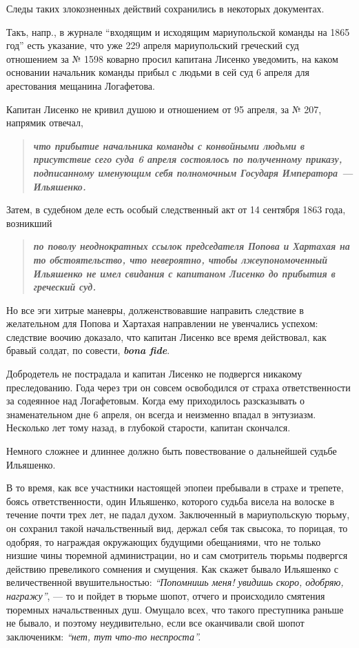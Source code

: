 \documentclass[a4paper,20pt]{report}
\begin{document}
Следы таких злокозненных действий сохранились в
некоторых документах.

Такъ, напр., в журнале ``входящим и исходящим
мариупольской команды на 1865 год'' есть указание, что
уже 229 апреля мариупольский греческий суд отношением 
за № 1598 коварно просил капитана Лисенко уведомить,
на каком основании начальник команды прибыл с людьми в сей суд 6 апреля для 
арестования мещанина Логафетова.

Капитан Лисенко не кривил душою и отношением от 95 апреля, за № 207, напрямик
отвечал, 

\begin{quote}
\em\bfseries
что прибытие начальника команды с конвойными людьми в
присутствие сего суда 6 апреля состоялось по полученному
приказу, подписанному именующим себя полномочным
Государя Императора — Ильяшенко.
\end{quote}

Затем, в судебном деле есть особый следственный
акт от 14 сентября 1863 года, возникший 
\begin{quote}
\em\bfseries
по поволу неоднократных ссылок председателя Попова и Хартахая
на то обстоятельство, что невероятно, чтобы лжеупономоченный 
Ильяшенко не имел свидания с капитаном Лисенко до прибытия в греческий суд.
\end{quote}

Но все эги хитрые маневры, долженствовавшие направить следствие в желательном для Попова и Хартахая
направлении не увенчались успехом: следствие воочию доказало, что капитан Лисенко все время действовал, как бравый
солдат, по совести, \textbf{\em bona fide}.

Добродетель не пострадала и капитан Лисенко не подвергся никакому
преследованию. Года через три он совсем освободился от страха ответственности
за содеянное над Логафетовым.  Когда ему приходилось разсказывать о
знаменательном дне 6 апреля, он всегда и неизменно впадал в энтузиазм.
Несколько лет тому назад, в глубокой старости, капитан скончался. 

Немного сложнее и длиннее должно быть повествование о дальнейшей судьбе Ильяшенко.

В то время, как все участники настоящей эпопеи
пребывали в страхе и трепете, боясь ответственности, один
Ильяшенко, которого судьба висела на волоске в течение
почти трех лет, не падал духом. Заключенный в мариупольскую тюрьму, он сохранил такой начальственный вид,
держал себя так свысока, то порицая, то одобряя,
то награждая окружающих будущими обещаниями, 
что не только низшие чины тюремной администрации, но и сам смотритель тюрьмы подвергся действию
превеликого сомнения и смущения. Как скажет бывало Ильяшенко 
с величественной ввушительностью: \emph{``Попомнишь меня! увидишь скоро,
одобряю, награжу''}, — то и пойдет в тюрьме шопот,
отчего и происходило смятения тюремных начальственных душ.
Омущало всех, что такого преступника раньше не
бывало, и поэтому неудивительно, если все оканчивали свой
шопот заключеникм: \emph{``нет, тут что-то неспроста''.}
\end{document}
